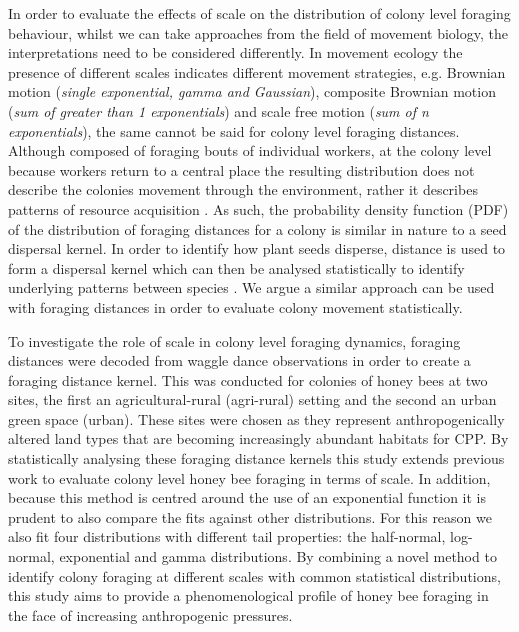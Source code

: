 \documentclass[11pt,usenames,dvipsnames]{article}
\begin{document}
In order to evaluate the effects of scale on the distribution of colony level foraging behaviour, whilst we can take approaches from the field of movement biology, the interpretations need to be considered differently. In movement ecology the presence of different scales indicates different movement strategies, e.g. Brownian motion (\textit{single exponential, gamma and Gaussian}), composite Brownian motion (\textit{sum of greater than 1 exponentials}) and scale free motion (\textit{sum of n exponentials}), the same cannot be said for colony level foraging distances. Although composed of foraging bouts of individual workers, at the colony level because workers return to a central place the resulting distribution does not describe the colonies movement through the environment, rather it describes patterns of resource acquisition \citep{Visscher1982, Waddington1994, Couvillon2014, Couvillon2015}. As such, the probability density function (PDF) of the distribution of foraging distances for a colony is similar in nature to a seed dispersal kernel. In order to identify how plant seeds disperse, distance is used to form a dispersal kernel which can then be analysed statistically to identify underlying patterns between species \citep{Bullock2017}. We argue a similar approach can be used with foraging distances in order to evaluate colony movement statistically. 

To investigate the role of scale in colony level foraging dynamics, foraging distances were decoded from waggle dance observations in order to create a foraging distance kernel. This was conducted for colonies of honey bees at two sites, the first an agricultural-rural (agri-rural) setting and the second an urban green space (urban). These sites were chosen as they represent anthropogenically altered land types that are becoming increasingly abundant habitats for CPP. By statistically analysing these foraging distance kernels this study extends previous work to evaluate colony level honey bee foraging in terms of scale. In addition, because this method is centred around the use of an exponential function it is prudent to also compare the fits against other distributions. For this reason we also fit four distributions with different tail properties: the half-normal, log-normal, exponential and gamma distributions. By combining a novel method to identify colony foraging at different scales with common statistical distributions, this study aims to provide a phenomenological profile of honey bee foraging in the face of increasing anthropogenic pressures.
\end{document}
